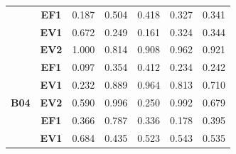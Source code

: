 \begin{table}[htbp]
\begin{tabular}{|ccccccc|}
		\rowcolor[HTML]{F2F2F2} 
		\multicolumn{1}{|c|}{\cellcolor[HTML]{F2F2F2}} & \multicolumn{1}{c|}{\cellcolor[HTML]{F2F2F2}\textbf{EF1}} & \multicolumn{1}{c|}{\cellcolor[HTML]{F2F2F2}0.187} & \multicolumn{1}{c|}{\cellcolor[HTML]{F2F2F2}0.504} & \multicolumn{1}{c|}{\cellcolor[HTML]{F2F2F2}0.418} & \multicolumn{1}{c|}{\cellcolor[HTML]{F2F2F2}0.327} & 0.341 \\ \cline{2-7} 
		\multicolumn{1}{|c|}{\cellcolor[HTML]{F2F2F2}} & \multicolumn{1}{c|}{\textbf{EV1}} & \multicolumn{1}{c|}{0.672} & \multicolumn{1}{c|}{0.249} & \multicolumn{1}{c|}{0.161} & \multicolumn{1}{c|}{0.324} & 0.344 \\ \cline{2-7} 
		\rowcolor[HTML]{F2F2F2} 
		\multicolumn{1}{|c|}{\multirow{-3}{*}{\cellcolor[HTML]{F2F2F2}\textbf{B03}}} & \multicolumn{1}{c|}{\cellcolor[HTML]{F2F2F2}\textbf{EV2}} & \multicolumn{1}{c|}{\cellcolor[HTML]{F2F2F2}1.000} & \multicolumn{1}{c|}{\cellcolor[HTML]{F2F2F2}0.814} & \multicolumn{1}{c|}{\cellcolor[HTML]{F2F2F2}0.908} & \multicolumn{1}{c|}{\cellcolor[HTML]{F2F2F2}0.962} & 0.921 \\ \hline
		\multicolumn{1}{|c|}{\cellcolor[HTML]{F2F2F2}} & \multicolumn{1}{c|}{\textbf{EF1}} & \multicolumn{1}{c|}{0.097} & \multicolumn{1}{c|}{0.354} & \multicolumn{1}{c|}{0.412} & \multicolumn{1}{c|}{0.234} & 0.242 \\ \cline{2-7} 
		\rowcolor[HTML]{F2F2F2} 
		\multicolumn{1}{|c|}{\cellcolor[HTML]{F2F2F2}} & \multicolumn{1}{c|}{\cellcolor[HTML]{F2F2F2}\textbf{EV1}} & \multicolumn{1}{c|}{\cellcolor[HTML]{F2F2F2}0.232} & \multicolumn{1}{c|}{\cellcolor[HTML]{F2F2F2}0.889} & \multicolumn{1}{c|}{\cellcolor[HTML]{F2F2F2}0.964} & \multicolumn{1}{c|}{\cellcolor[HTML]{F2F2F2}0.813} & 0.710 \\ \cline{2-7} 
		\multicolumn{1}{|c|}{\multirow{-3}{*}{\cellcolor[HTML]{F2F2F2}\textbf{B04}}} & \multicolumn{1}{c|}{\textbf{EV2}} & \multicolumn{1}{c|}{0.590} & \multicolumn{1}{c|}{0.996} & \multicolumn{1}{c|}{0.250} & \multicolumn{1}{c|}{0.992} & 0.679 \\ \hline
		\rowcolor[HTML]{F2F2F2} 
		\multicolumn{1}{|c|}{\cellcolor[HTML]{F2F2F2}} & \multicolumn{1}{c|}{\cellcolor[HTML]{F2F2F2}\textbf{EF1}} & \multicolumn{1}{c|}{\cellcolor[HTML]{F2F2F2}0.366} & \multicolumn{1}{c|}{\cellcolor[HTML]{F2F2F2}0.787} & \multicolumn{1}{c|}{\cellcolor[HTML]{F2F2F2}0.336} & \multicolumn{1}{c|}{\cellcolor[HTML]{F2F2F2}0.178} & 0.395 \\ \cline{2-7} 
		\multicolumn{1}{|c|}{\cellcolor[HTML]{F2F2F2}} & \multicolumn{1}{c|}{\textbf{EV1}} & \multicolumn{1}{c|}{0.684} & \multicolumn{1}{c|}{0.435} & \multicolumn{1}{c|}{0.523} & \multicolumn{1}{c|}{0.543} & 0.535 \\ \cline{2-7} 

\end{tabular}
\end{table}
